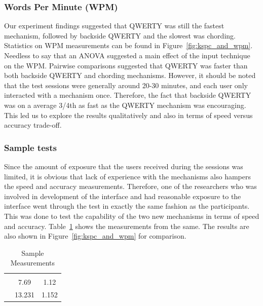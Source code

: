 \subsubsection{Words Per Minute (WPM)}

Our experiment findings suggested that QWERTY was still the fastest
mechanism, followed by backside QWERTY and the slowest was
chording. Statistics on WPM measurements can be found in
Figure~\ref{fig:kspc_and_wpm}. Needless to say that an ANOVA
suggested a main effect of the input technique on the WPM. Pairwise
comparisons suggested that QWERTY was faster than both backside QWERTY
and chording mechanisms. However, it should be noted that the test
sessions were generally around 20-30 minutes, and each user only
interacted with a mechanism once. Therefore, the fact that backside
QWERTY was on a average 3/4th as fast as the QWERTY mechanism was
encouraging. This led us to explore the results qualitatively and also
in terms of speed versus accuracy trade-off.


\subsubsection{Sample tests}

Since the amount of exposure that the users received during the
sessions was limited, it is obvious that lack of experience with the
mechanisms also hampers the speed and accuracy
measurements. Therefore, one of the researchers who was involved in
development of the interface and had reasonable exposure to the
interface went through the test in exactly the same fashion as the
participants. This was done to test the capability of the two new
mechanisms in terms of speed and
accuracy. Table~\ref{tab:StatisticsForTestCorpora} shows the
measurements from the same.  The results are also shown in
Figure~\ref{fig:kspc_and_wpm} for comparison.

\begin{table}
	\centering
		\begin{tabular}{rcc} 
		                         & \color{grey}{WPM}    & \color{grey}{KSPC} \\ 
                   \color{grey}{Chording} & 7.69   & 1.12 \\ 
                   \color{grey}{Backside QWERTY} & 13.231 & 1.152 \\ 
		\end{tabular}
	\caption{Sample Measurements}
	\label{tab:StatisticsForTestCorpora}
\end{table}

